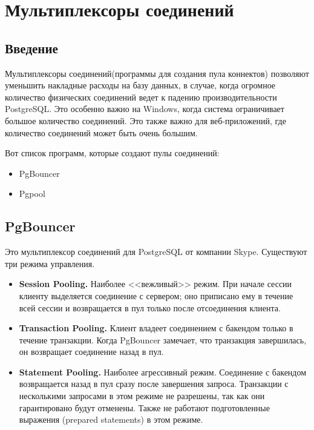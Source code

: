 \chapter{Мультиплексоры соединений}
\begin{epigraphs}
\end{epigraphs}
\section{Введение}
Мультиплексоры соединений(программы для создания пула коннектов) позволяют уменьшить накладные расходы на базу данных, 
в случае, когда огромное количество физических соединений ведет к падению производительности PostgreSQL. 
Это особенно важно на Windows, когда система ограничивает большое количество соединений. 
Это также важно для веб-приложений, где количество соединений может быть очень большим.

Вот список программ, которые создают пулы соединений:
\begin{itemize}
\item PgBouncer
\item Pgpool
\end{itemize}

\section{PgBouncer}
Это мультиплексор соединений для PostgreSQL от компании Skype. Существуют три режима управления.
\begin{itemize}
\item \textbf{Session Pooling.}
Наиболее <<вежливый>> режим. При начале сессии клиенту выделяется соединение с сервером; 
оно приписано ему в течение всей сессии и возвращается в пул только после отсоединения клиента. 
\item \textbf{Transaction Pooling.} 
Клиент владеет соединением с бакендом только в течение транзакции. Когда PgBouncer замечает, 
что транзакция завершилась, он возвращает соединение назад в пул. 
\item \textbf{Statement Pooling.} 
Наиболее агрессивный режим. Соединение с бакендом возвращается назад в пул сразу после завершения 
запроса. Транзакции с несколькими запросами в этом режиме не разрешены, так как они гарантировано будут отменены.
Также не работают подготовленные выражения (prepared statements) в этом режиме.
\end{itemize}

